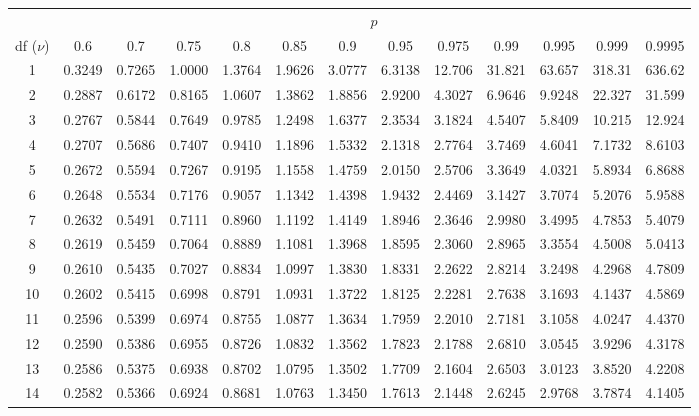 \begin{table}[htbp]
	\centering
	\setlength{\tabcolsep}{7pt}
	\begin{tabular}{ccccccccccccc}
		& \multicolumn{12}{c}{$p$}\\
		\cline{2-13}
		df ($\nu$) & 0.6 & 0.7 & 0.75 & 0.8 & 0.85 & 0.9 & 0.95 & 0.975 & 0.99 & 0.995 & 0.999 & 0.9995 \\
		\hline
		1 & 0.3249 & 0.7265 & 1.0000 & 1.3764 & 1.9626 & 3.0777 & 6.3138 & 12.706 & 31.821 & 63.657 & 318.31 & 636.62 \\
		2 & 0.2887 & 0.6172 & 0.8165 & 1.0607 & 1.3862 & 1.8856 & 2.9200 & 4.3027 & 6.9646 & 9.9248 & 22.327 & 31.599 \\
		3 & 0.2767 & 0.5844 & 0.7649 & 0.9785 & 1.2498 & 1.6377 & 2.3534 & 3.1824 & 4.5407 & 5.8409 & 10.215 & 12.924 \\
		4 & 0.2707 & 0.5686 & 0.7407 & 0.9410 & 1.1896 & 1.5332 & 2.1318 & 2.7764 & 3.7469 & 4.6041 & 7.1732 & 8.6103 \\
		5 & 0.2672 & 0.5594 & 0.7267 & 0.9195 & 1.1558 & 1.4759 & 2.0150 & 2.5706 & 3.3649 & 4.0321 & 5.8934 & 6.8688 \\
		6 & 0.2648 & 0.5534 & 0.7176 & 0.9057 & 1.1342 & 1.4398 & 1.9432 & 2.4469 & 3.1427 & 3.7074 & 5.2076 & 5.9588 \\
		7 & 0.2632 & 0.5491 & 0.7111 & 0.8960 & 1.1192 & 1.4149 & 1.8946 & 2.3646 & 2.9980 & 3.4995 & 4.7853 & 5.4079 \\
		8 & 0.2619 & 0.5459 & 0.7064 & 0.8889 & 1.1081 & 1.3968 & 1.8595 & 2.3060 & 2.8965 & 3.3554 & 4.5008 & 5.0413 \\
		9 & 0.2610 & 0.5435 & 0.7027 & 0.8834 & 1.0997 & 1.3830 & 1.8331 & 2.2622 & 2.8214 & 3.2498 & 4.2968 & 4.7809 \\
		10 & 0.2602 & 0.5415 & 0.6998 & 0.8791 & 1.0931 & 1.3722 & 1.8125 & 2.2281 & 2.7638 & 3.1693 & 4.1437 & 4.5869 \\[5pt]
		11 & 0.2596 & 0.5399 & 0.6974 & 0.8755 & 1.0877 & 1.3634 & 1.7959 & 2.2010 & 2.7181 & 3.1058 & 4.0247 & 4.4370 \\
		12 & 0.2590 & 0.5386 & 0.6955 & 0.8726 & 1.0832 & 1.3562 & 1.7823 & 2.1788 & 2.6810 & 3.0545 & 3.9296 & 4.3178 \\
		13 & 0.2586 & 0.5375 & 0.6938 & 0.8702 & 1.0795 & 1.3502 & 1.7709 & 2.1604 & 2.6503 & 3.0123 & 3.8520 & 4.2208 \\
		14 & 0.2582 & 0.5366 & 0.6924 & 0.8681 & 1.0763 & 1.3450 & 1.7613 & 2.1448 & 2.6245 & 2.9768 & 3.7874 & 4.1405 \\

\end{tabular}
\end{table}
